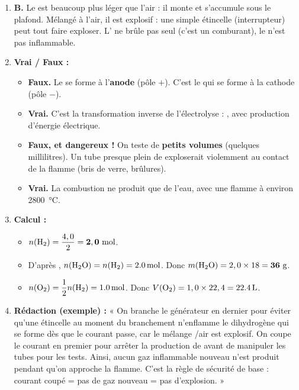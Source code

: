 \documentclass[11pt]{article}
\begin{document}
\begin{corrige}
\begin{enumerate}
    \item \textbf{B.} Le  est beaucoup plus léger que l'air : il monte et s'accumule sous le plafond. Mélangé à l'air, il est explosif : une simple étincelle (interrupteur) peut tout faire exploser. L' ne brûle pas seul (c'est un comburant), le  n'est pas inflammable.
    \item \textbf{Vrai / Faux :}
    \begin{itemize}
        \item[a.] \textbf{Faux.} Le  se forme à l'\textbf{anode} (pôle $+$). C'est le  qui se forme à la cathode (pôle $-$).
        \item[b.] \textbf{Vrai.} C'est la transformation inverse de l'électrolyse : , avec production d'énergie électrique.
        \item[c.] \textbf{Faux, et dangereux !} On teste de \textbf{petits volumes} (quelques millilitres). Un tube presque plein de  exploserait violemment au contact de la flamme (bris de verre, brûlures).
        \item[d.] \textbf{Vrai.} La combustion  ne produit que de l'eau, avec une flamme à environ \SI{2800}{\celsius}.
    \end{itemize}
    \item \textbf{Calcul :}
    \begin{itemize}
        \item[a.] $n(\ce{H2}) = \dfrac{4,0}{2} = \mathbf{2,0 \text{ mol}}$.
        \item[b.] D'après , $n(\ce{H2O}) = n(\ce{H2}) = \SI{2,0}{mol}$. Donc $m(\ce{H2O}) = 2,0 \times 18 = \mathbf{36 \text{ g}}$.
        \item[c.] $n(\ce{O2}) = \dfrac{1}{2} n(\ce{H2}) = \SI{1,0}{mol}$. Donc $V(\ce{O2}) = 1,0 \times 22,4 = \mathbf{\SI{22,4}{L}}$.
    \end{itemize}
    \item \textbf{Rédaction (exemple) :} « On branche le générateur en dernier pour éviter qu'une étincelle au moment du branchement n'enflamme le dihydrogène  qui se forme dès que le courant passe, car le mélange /air est explosif. On coupe le courant en premier pour arrêter la production de  avant de manipuler les tubes pour les tests. Ainsi, aucun gaz inflammable nouveau n'est produit pendant qu'on approche la flamme. C'est la règle de sécurité de base : courant coupé = pas de gaz nouveau = pas d'explosion. »
\end{enumerate}
\end{corrige}
\end{document}
